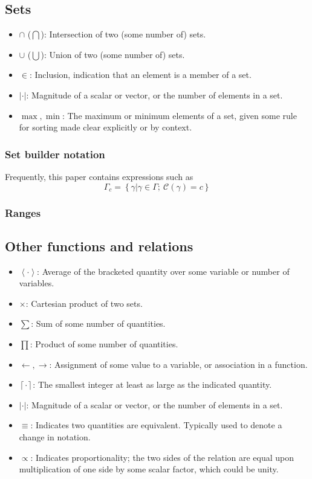 \documentclass{article}
\newcommand{\braces}[1]{\ensuremath{\left\lbrace #1 \right\rbrace}}
\newcommand{\angles}[1]{\ensuremath{\left\langle #1 \right\rangle}}
\newcommand{\abs}[1]{\ensuremath{\left|#1\right|}}
\newcommand{\channel}{\ensuremath{c}}
\newcommand{\Channel}{\ensuremath{\mathcal{C}}}
\newcommand{\photon}{\ensuremath{\gamma}}
\newcommand{\photons}{\ensuremath{\Gamma}}
\newcommand{\ceil}[1]{\ensuremath{\left\lceil #1\right\rceil}}
\begin{document}
\begin{appendix}
\subsection{Sets}
\begin{itemize}
\item $\cap$ ($\bigcap$): Intersection of two (some number of) sets.
\item $\cup$ ($\bigcup$): Union of two (some number of) sets.
\item $\in$: Inclusion, indication that an element is a member of a set.
\item $\abs{\cdot}$: Magnitude of a scalar or vector, or the number of elements in a set.
\item $\max,\min$: The maximum or minimum elements of a set, given some rule for sorting made clear explicitly or by context.
\end{itemize}

\subsubsection{Set builder notation}
Frequently, this paper contains expressions such as
\begin{equation}
\photons_{\channel}=\braces{\photon\left|\photon\in\photons;~\Channel(\photon)=\channel\right.}
\end{equation}

\subsubsection{Ranges}

\subsection{Other functions and relations}
\begin{itemize}
\item \angles{\cdot}: Average of the bracketed quantity over some variable or number of variables.
\item $\times$: Cartesian product of two sets.
\item $\sum$: Sum of some number of quantities.
\item $\prod$: Product of some number of quantities.
\item $\leftarrow,\rightarrow$: Assignment of some value to a variable, or association in a function.
\item $\ceil{\cdot}$: The smallest integer at least as large as the indicated quantity.
\item $\abs{\cdot}$: Magnitude of a scalar or vector, or the number of elements in a set.
\item $\equiv$: Indicates two quantities are equivalent. Typically used to denote a change in notation.
\item $\propto$: Indicates proportionality; the two sides of the relation are equal upon multiplication of one side by some scalar factor, which could be unity.
\end{itemize}

\end{appendix}
\end{document}
